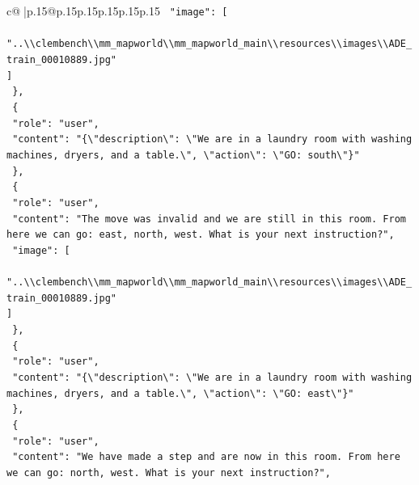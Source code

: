 \documentclass{article}
\begin{document}
{\begin{supertabular}{c@{$\;$}|p{.15\linewidth}@{}p{.15\linewidth}p{.15\linewidth}p{.15\linewidth}p{.15\linewidth}p{.15\linewidth}}
{{{\texttt{    "image": {[}} \\
\texttt{      "..\textbackslash{}\textbackslash{}clembench\textbackslash{}\textbackslash{}mm\_mapworld\textbackslash{}\textbackslash{}mm\_mapworld\_main\textbackslash{}\textbackslash{}resources\textbackslash{}\textbackslash{}images\textbackslash{}\textbackslash{}ADE\_train\_00010889.jpg"} \\
\texttt{    {]}} \\
\texttt{  \},} \\
\texttt{  \{} \\
\texttt{    "role": "user",} \\
\texttt{    "content": "\{\textbackslash{}"description\textbackslash{}": \textbackslash{}"We are in a laundry room with washing machines, dryers, and a table.\textbackslash{}", \textbackslash{}"action\textbackslash{}": \textbackslash{}"GO: south\textbackslash{}"\}"} \\
\texttt{  \},} \\
\texttt{  \{} \\
\texttt{    "role": "user",} \\
\texttt{    "content": "The move was invalid and we are still in this room. From here we can go: east, north, west. What is your next instruction?",} \\
\texttt{    "image": {[}} \\
\texttt{      "..\textbackslash{}\textbackslash{}clembench\textbackslash{}\textbackslash{}mm\_mapworld\textbackslash{}\textbackslash{}mm\_mapworld\_main\textbackslash{}\textbackslash{}resources\textbackslash{}\textbackslash{}images\textbackslash{}\textbackslash{}ADE\_train\_00010889.jpg"} \\
\texttt{    {]}} \\
\texttt{  \},} \\
\texttt{  \{} \\
\texttt{    "role": "user",} \\
\texttt{    "content": "\{\textbackslash{}"description\textbackslash{}": \textbackslash{}"We are in a laundry room with washing machines, dryers, and a table.\textbackslash{}", \textbackslash{}"action\textbackslash{}": \textbackslash{}"GO: east\textbackslash{}"\}"} \\
\texttt{  \},} \\
\texttt{  \{} \\
\texttt{    "role": "user",} \\
\texttt{    "content": "We have made a step and are now in this room. From here we can go: north, west. What is your next instruction?",} \\
}}}
\end{supertabular}}
\end{document}
